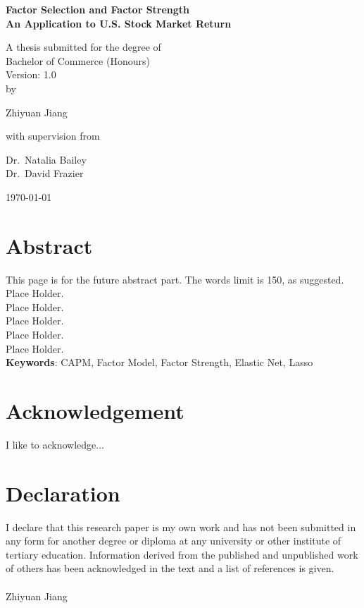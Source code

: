 
\begin{titlepage}
		{\centering

			\vspace{0.5cm}
			{\huge\bfseries Factor Selection and Factor Strength\\
				\Large An Application to U.S. Stock Market Return\par}
			\vspace{1cm}
			{\large A thesis submitted for the degree of\\
			Bachelor of Commerce (Honours)\\}
		\vspace{0.3cm}
		{\LARGE Version: 1.0\\}
		\vspace{1cm}
		{\small by\\}
			{\Large Zhiyuan Jiang\\\par}
\vspace{1cm}
			{\small with supervision from\par}
{\Large			Dr.~Natalia Bailey\\ Dr.~David Frazier\\}


			
			\vfill
		{\centering\large \today\par}}
\end{titlepage}

\chapter*{Abstract}
This page is for the future abstract part.
The words limit is 150, as suggested.\\
Place Holder.\\
Place Holder.\\
Place Holder.\\
Place Holder.\\
Place Holder.\\
 \textbf{Keywords}: CAPM, Factor Model, Factor Strength, Elastic Net, Lasso


\chapter*{Acknowledgement}
I like to acknowledge...

\chapter*{Declaration}
I declare that this research paper is my own work and has not been submitted in any form for another degree or diploma at any university or other institute of tertiary education. Information derived from the published and unpublished work of others has been acknowledged in the text and a list of references is given.\\
\vspace{0.7cm}\\
Zhiyuan Jiang

